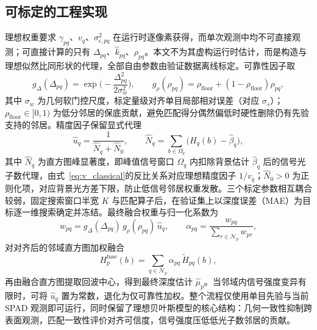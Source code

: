 \subsection{可标定的工程实现}
\label{sec:engineering}

理想权重要求 $\gamma_{pq}$、$v_q$、$\sigma_{\epsilon,pq}^2$ 在运行时逐像素获得，而单次观测中均不可直接观测；可直接计算的只有 $\Delta_{pq}$、$\hat k_{pq}$、$\rho_{pq}$。本文不为其虚构运行时估计，而是构造与理想似然比同形状的代理，全部自由参数由验证数据离线标定。可靠性因子取
\begin{equation}
  g_{\Delta}(\Delta_{pq})=\exp\!\Big(-\frac{\Delta_{pq}^2}{2\sigma_w^2}\Big),
  \qquad
  g_{\rho}(\rho_{pq})=\rho_{\mathrm{floor}}+(1-\rho_{\mathrm{floor}})\rho_{pq},
  \label{eq:reliability}
\end{equation}
其中 $\sigma_w$ 为几何软门控尺度，标定量级对齐单目局部相对误差（对应 $\sigma_s$）；$\rho_{\mathrm{floor}}\in[0,1)$ 为低分邻居的保底贡献，避免匹配得分偶然偏低时硬性删除仍有先验支持的邻居。精度因子保留显式代理
\begin{equation}
  \hat u_q=\frac{1}{\hat N_q+\hat N_0},
  \qquad
  \hat N_q=\sum_{b\in\Omega_q}\big(H_q(b)-\hat\beta_q\big),
  \label{eq:precision_proxy}
\end{equation}
其中 $\hat N_q$ 为直方图峰显著度，即峰值信号窗口 $\Omega_q$ 内扣除背景估计 $\hat\beta_q$ 后的信号光子数代理，由式~\eqref{eq:v_classical}的反比关系对应理想精度因子 $1/v_q$；$\hat N_0>0$ 为正则化项，对应背景光方差下限，防止低信号邻居权重发散。三个标定参数相互耦合较弱，固定搜索窗口半宽 $K$ 与匹配算子后，在验证集上以深度误差（MAE）为目标逐一维搜索确定并冻结。最终融合权重与归一化系数为
\begin{equation}
  w_{pq}=g_{\Delta}(\Delta_{pq})\,g_{\rho}(\rho_{pq})\,\hat u_q,
  \qquad
  \alpha_{pq}=\frac{w_{pq}}{\sum_{r\in\mathcal{N}_p}w_{pr}},
  \label{eq:weight}
\end{equation}
对对齐后的邻域直方图加权融合
\begin{equation}
  H_p^{\mathrm{fuse}}(b)
  =\sum_{q\in\mathcal{N}_p}\alpha_{pq}\,\widetilde H_{pq}(b),
  \label{eq:fuse}
\end{equation}
再由融合直方图提取回波中心，得到最终深度估计 $\hat\mu_p$。当邻域内信号强度变异有限时，可将 $\hat u_q$ 置为常数，退化为仅可靠性加权。整个流程仅使用单目先验与当前 SPAD 观测即可运行，同时保留了理想贝叶斯模型的核心结构：几何一致性抑制跨表面观测，匹配一致性评价对齐可信度，信号强度压低低光子数邻居的贡献。
